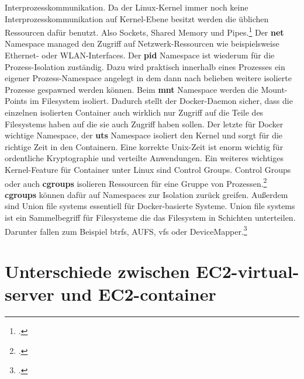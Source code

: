 \documentclass[titlepage]{report}
\begin{document}
Interprozesskommunikation. Da der Linux\hyp{}Kernel immer noch keine
Interprozesskommunikation auf Kernel\hyp{}Ebene besitzt werden die
üblichen Ressourcen dafür benutzt. Also Sockets, Shared Memory und
Pipes.\footcite{ipc} Der \textbf{net} Namespace managed den Zugriff auf
Netzwerk\hyp{}Ressourcen wie beispielsweise Ethernet\hyp{} oder
WLAN\hyp{}Interfaces. Der \textbf{pid} Namespace ist wiederum für die
Prozess\hyp{}Isolation zuständig. Dazu wird praktisch innerhalb eines
Prozesses ein eigener Prozess\hyp{}Namespace angelegt in dem dann nach
belieben weitere isolierte Prozesse gespawned werden können. Beim
\textbf{mnt} Namespace werden die Mount\hyp{}Points im Filesystem
isoliert. Dadurch stellt der Docker\hyp{}Daemon sicher, dass die
einzelnen isolierten Container auch wirklich nur Zugriff auf die Teile
des Filesystems haben auf die sie auch Zugriff haben sollen. Der letzte
für Docker wichtige Namespace, der \textbf{uts} Namespace isoliert den
Kernel und sorgt für die richtige Zeit in den Containern. Eine korrekte
Unix\hyp{}Zeit ist enorm wichtig für ordentliche Kryptographie und
verteilte Anwendungen. Ein weiteres wichtiges Kernel\hyp{}Feature für
Container unter Linux sind Control Groups. Control Groups oder auch
\textbf{cgroups} isolieren Ressourcen für eine Gruppe von
Prozessen.\footcite{cgroups} \textbf{cgroups} können dafür auf
Namespaces zur Isolation zurück greifen. Außerdem sind Union file
systems essentiell für Docker\hyp{}basierte Systeme. Union file systems
ist ein Sammelbegriff für Filesysteme die das Filesystem in Schichten
unterteilen. Darunter fallen zum Beispiel btrfs, AUFS, vfs oder
DeviceMapper.\footcite{docker}
\section{Unterschiede zwischen EC2\hyp{}virtual\hyp{}server und EC2\hyp{}container}
\nocite{*}
\printbibliography
\listoffigures
\end{document}
